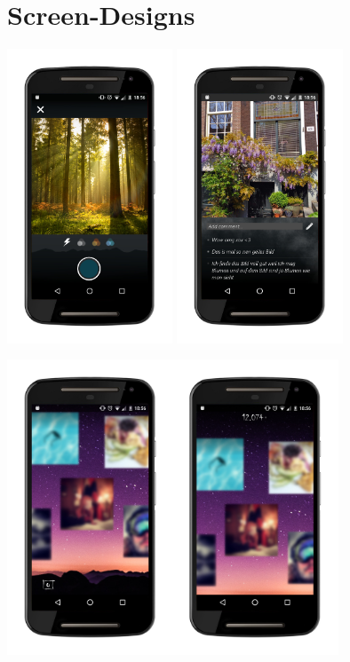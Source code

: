\chapter{Screen-Designs}

\begin{center}
\includegraphics[width=0.37\textwidth]{assets/Screen-Camera.jpg}
\includegraphics[width=0.37\textwidth]{assets/Screen-Image.jpg}

\includegraphics[width=0.74\textwidth]{assets/Screen-Home.jpg}
\end{center}

